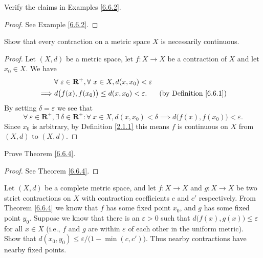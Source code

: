 \begin{exercise}\label{ex 6.6.5}
    Verify the claims in Examples \ref{6.6.2}.
\end{exercise}

\begin{proof}
    See Example \ref{6.6.2}.
\end{proof}

\begin{exercise}\label{ex 6.6.6}
    Show that every contraction on a metric space \(X\) is necessarily continuous.
\end{exercise}

\begin{proof}
    Let \((X, d)\) be a metric space, let \(f : X \to X\) be a contraction of \(X\) and let \(x_0 \in X\).
    We have
    \begin{align*}
                 & \forall\ \varepsilon \in \mathbf{R}^+, \forall\ x \in X, d(x, x_0) < \varepsilon                                      \\
        \implies & d\big(f(x), f(x_0)\big) \leq d(x, x_0) < \varepsilon.                            & \text{(by Definition \ref{6.6.1})}
    \end{align*}
    By setting \(\delta = \varepsilon\) we see that
    \[
        \forall\ \varepsilon \in \mathbf{R}^+, \exists\ \delta \in \mathbf{R}^+ : \forall\ x \in X, d(x, x_0) < \delta \implies d\big(f(x), f(x_0)\big) < \varepsilon.
    \]
    Since \(x_0\) is arbitrary, by Definition \ref{2.1.1} this means \(f\) is continuous on \(X\) from \((X, d)\) to \((X, d)\).
\end{proof}

\begin{exercise}\label{ex 6.6.7}
    Prove Theorem \ref{6.6.4}.
\end{exercise}

\begin{proof}
    See Theorem \ref{6.6.4}.
\end{proof}

\begin{exercise}\label{ex 6.6.8}
    Let \((X, d)\) be a complete metric space, and let \(f : X \to X\) and \(g : X \to X\) be two strict contractions on \(X\) with contraction coefficients \(c\) and \(c'\) respectively.
    From Theorem \ref{6.6.4} we know that \(f\) has some fixed point \(x_0\), and \(g\) has some fixed point \(y_0\).
    Suppose we know that there is an \(\varepsilon > 0\) such that \(d\big(f(x), g(x)\big) \leq \varepsilon\) for all \(x \in X\)
    (i.e., \(f\) and \(g\) are within \(\varepsilon\) of each other in the uniform metric).
    Show that \(d(x_0, y_0) \leq \varepsilon / \big(1 - \min(c, c')\big)\).
    Thus nearby contractions have nearby fixed points.
\end{exercise}